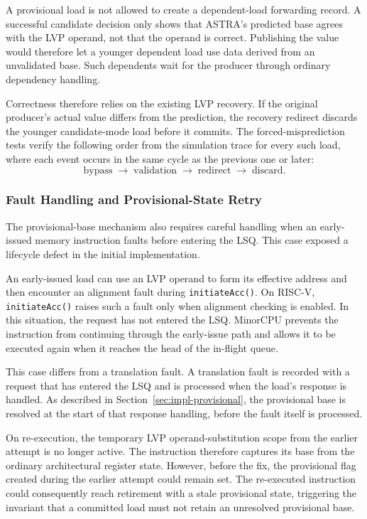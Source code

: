 A provisional load is not allowed to create a dependent-load
forwarding record. A successful candidate decision only shows that
ASTRA's predicted base agrees with the LVP operand, not that the
operand is correct. Publishing the value would therefore let a younger
dependent load use data derived from an unvalidated base. Such
dependents wait for the producer through ordinary dependency handling.

Correctness therefore relies on the existing LVP recovery. If the
original producer's actual value differs from the prediction, the
recovery redirect discards the younger candidate-mode load before it
commits. The forced-misprediction tests verify the following order
from the simulation trace for every such load, where each event occurs
in the same cycle as the previous one or later:
\[
    \text{bypass}
    \;\rightarrow\;
    \text{validation}
    \;\rightarrow\;
    \text{redirect}
    \;\rightarrow\;
    \text{discard}.
\]

\subsubsection{Fault Handling and Provisional-State Retry}

The provisional-base mechanism also requires careful handling
when an early-issued memory instruction faults before entering
the LSQ. This case exposed a lifecycle defect in the initial
implementation.

An early-issued load can use an LVP operand to form its effective
address and then encounter an alignment fault during
\texttt{initiateAcc()}. On RISC-V, \texttt{initiateAcc()} raises such
a fault only when alignment checking is enabled. In this situation,
the request has not entered the LSQ. MinorCPU prevents the instruction
from continuing through the early-issue path and allows it to be
executed again when it reaches the head of the in-flight queue.

This case differs from a translation fault. A translation fault is
recorded with a request that has entered the LSQ and is processed
when the load's response is handled. As described in
Section~\ref{sec:impl-provisional}, the provisional base is resolved
at the start of that response handling, before the fault itself is
processed.

On re-execution, the temporary LVP operand-substitution scope
from the earlier attempt is no longer active. The instruction
therefore captures its base from the ordinary architectural
register state. However, before the fix, the provisional flag
created during the earlier attempt could remain set. The
re-executed instruction could consequently reach retirement
with a stale provisional state, triggering the invariant that
a committed load must not retain an unresolved provisional
base.

